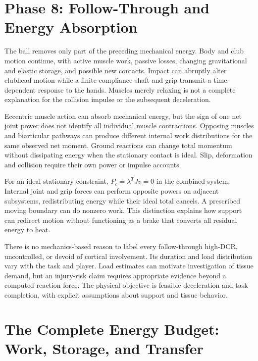\section{Phase 8: Follow-Through and Energy Absorption}

The ball removes only part of the preceding mechanical energy. Body and club motion continue, with active muscle work, passive losses, changing gravitational and elastic storage, and possible new contacts. Impact can abruptly alter clubhead motion while a finite-compliance shaft and grip transmit a time-dependent response to the hands. Muscles merely relaxing is not a complete explanation for the collision impulse or the subsequent deceleration.

Eccentric muscle action can absorb mechanical energy, but the sign of one net joint power does not identify all individual muscle contractions. Opposing muscles and biarticular pathways can produce different internal work distributions for the same observed net moment. Ground reactions can change total momentum without dissipating energy when the stationary contact is ideal. Slip, deformation and collision require their own power or impulse accounts.

For an ideal stationary constraint, $P_c=\lambda^TJv=0$ in the combined system. Internal joint and grip forces can perform opposite powers on adjacent subsystems, redistributing energy while their ideal total cancels. A prescribed moving boundary can do nonzero work. This distinction explains how support can redirect motion without functioning as a brake that converts all residual energy to heat.

There is no mechanics-based reason to label every follow-through high-DCR, uncontrolled, or devoid of cortical involvement. Its duration and load distribution vary with the task and player. Load estimates can motivate investigation of tissue demand, but an injury-risk claim requires appropriate evidence beyond a computed reaction force. The physical objective is feasible deceleration and task completion, with explicit assumptions about support and tissue behavior.

\section[The Complete Energy Budget: Work, Storage, and Transfer]{The Complete Energy Budget:\\Work, Storage, and Transfer}

